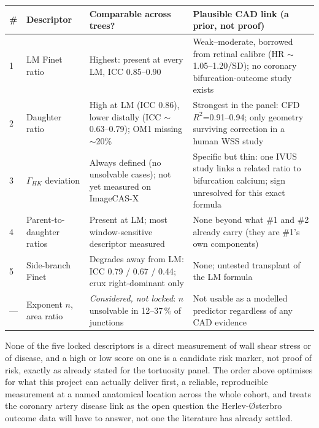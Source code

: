 \documentclass[11pt]{article}
\begin{document}
\begin{table}[h]
\centering
\small
\begin{tabular}{@{}p{0.4cm}p{3.6cm}p{5.1cm}p{5.6cm}@{}}
\toprule
\# & Descriptor & Comparable across trees? & Plausible CAD link (a prior, not proof) \\
\midrule
1 & LM Finet ratio & Highest: present at every LM, ICC 0.85--0.90 & Weak--moderate, borrowed from retinal calibre (HR $\sim$1.05--1.20/SD); no coronary bifurcation-outcome study exists \\
2 & Daughter ratio & High at LM (ICC 0.86), lower distally (ICC $\sim$0.63--0.79); OM1 missing $\sim$20\% & Strongest in the panel: CFD $R^2$=0.91--0.94; only geometry surviving correction in a human WSS study \\
3 & $\Gamma_{HK}$ deviation & Always defined (no unsolvable cases); not yet measured on ImageCAS-X & Specific but thin: one IVUS study links a related ratio to bifurcation calcium; sign unresolved for this exact formula \\
4 & Parent-to-daughter ratios & Present at LM; most window-sensitive descriptor measured & None beyond what \#1 and \#2 already carry (they are \#1's own components) \\
5 & Side-branch Finet & Degrades away from LM: ICC 0.79 / 0.67 / 0.44; crux right-dominant only & None; untested transplant of the LM formula \\
--- & Exponent $n$, area ratio & \emph{Considered, not locked}: $n$ unsolvable in 12--37\,\% of junctions & Not usable as a modelled predictor regardless of any CAD evidence \\
\bottomrule
\end{tabular}
\end{table}

None of the five locked descriptors is a direct measurement of wall shear stress or of disease, and
a high or low score on one is a candidate risk marker, not proof of risk, exactly as already stated
for the tortuosity panel. The order above optimises for what this project can actually deliver first,
a reliable, reproducible measurement at a named anatomical location across the whole cohort, and
treats the coronary artery disease link as the open question the Herlev-\O{}sterbro outcome data will
have to answer, not one the literature has already settled.
\end{document}
